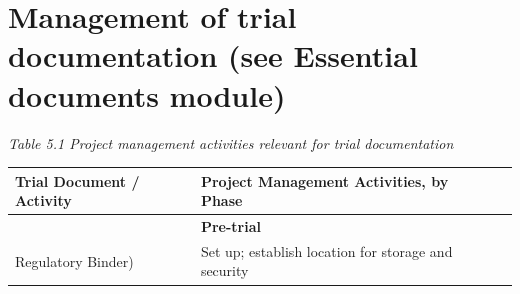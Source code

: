 \documentclass[]{book}
\begin{document}
\section{Management of trial documentation (see Essential documents
module)}\label{management-of-trial-documentation-see-essential-documents-module}

\emph{Table 5.1 Project management activities relevant for trial
documentation}

\begin{longtable}[]{@{}llll@{}}
\toprule
\begin{minipage}[b]{0.08\columnwidth}\raggedright\strut
Trial Document / Activity\strut
\end{minipage} & \begin{minipage}[b]{0.28\columnwidth}\raggedright\strut
Project Management Activities, by Phase\strut
\end{minipage} & \begin{minipage}[b]{0.35\columnwidth}\raggedright\strut
\strut
\end{minipage} & \begin{minipage}[b]{0.17\columnwidth}\raggedright\strut
\strut
\end{minipage}\tabularnewline
\midrule
\endhead
\begin{minipage}[t]{0.08\columnwidth}\raggedright\strut
\strut
\end{minipage} & \begin{minipage}[t]{0.28\columnwidth}\raggedright\strut
\textbf{Pre-trial}\strut
\end{minipage} & \begin{minipage}[t]{0.35\columnwidth}\raggedright\strut
\strut
\end{minipage} & \begin{minipage}[t]{0.17\columnwidth}\raggedright\strut
\strut
\end{minipage}\tabularnewline
\begin{minipage}[t]{0.08\columnwidth}\raggedright\strut
Regulatory Binder)\strut
\end{minipage} & \begin{minipage}[t]{0.28\columnwidth}\raggedright\strut
Set up; establish location for storage and security\strut
\end{minipage} & \begin{minipage}[t]{0.35\columnwidth}\raggedright\strut
\strut
\end{minipage} & \begin{minipage}[t]{0.17\columnwidth}\raggedright\strut

\end{minipage}
\end{longtable}
\end{document}
